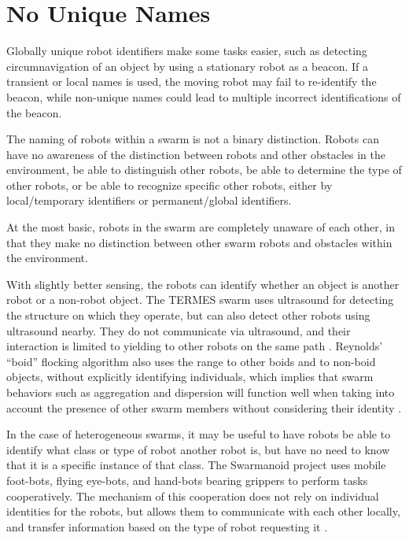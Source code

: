 \documentclass[]{article}
\begin{document}

\section{No Unique Names}

Globally unique robot identifiers make some tasks easier, such as detecting circumnavigation of an object by using a stationary robot as a beacon. 
If a transient or local names is used, the moving robot may fail to re-identify the beacon, while non-unique names could lead to multiple incorrect identifications of the beacon.


The naming of robots within a swarm is not a binary distinction. Robots can have no awareness of the distinction between robots and other obstacles in the environment, be able to distinguish other robots, be able to determine the type of other robots, or be able to recognize specific other robots, either by local/temporary identifiers or permanent/global identifiers. 

At the most basic, robots in the swarm are completely unaware of each other, in that they make no distinction between other swarm robots and obstacles within the environment. 

With slightly better sensing, the robots can identify whether an object is another robot or a non-robot object. The TERMES swarm uses ultrasound for detecting the structure on which they operate, but can also detect other robots using ultrasound nearby. They do not communicate via ultrasound, and their interaction is limited to yielding to other robots on the same path \cite{werfel2014designing}. Reynolds' ``boid'' flocking algorithm also uses the range to other boids and to non-boid objects, without explicitly identifying individuals, which implies that swarm behaviors such as aggregation and dispersion will function well when taking into account the presence of other swarm members without considering their identity \cite{reynolds1987flocks}. 

In the case of heterogeneous swarms, it may be useful to have robots be able to identify what class or type of robot another robot is, but have no need to know that it is a specific instance of that class. The Swarmanoid project uses mobile foot-bots, flying eye-bots, and hand-bots bearing grippers to perform tasks cooperatively. The mechanism of this cooperation does not rely on individual identities for the robots, but allows them to communicate with each other locally, and transfer information based on the type of robot requesting it \cite{ducatelle2011self}. 
\end{document}
